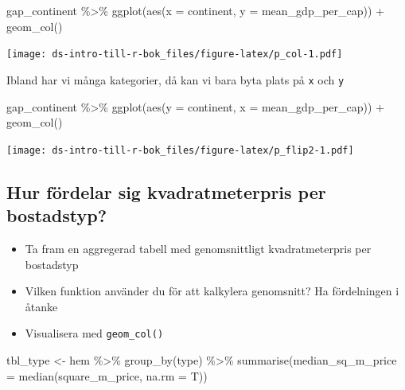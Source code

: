 \documentclass[
]{book}
\newenvironment{Shaded}{\begin{snugshade}}{\end{snugshade}}
\newcommand{\AttributeTok}[1]{\textcolor[rgb]{0.77,0.63,0.00}{#1}}
\newcommand{\FunctionTok}[1]{\textcolor[rgb]{0.00,0.00,0.00}{#1}}
\newcommand{\NormalTok}[1]{#1}
\newcommand{\OtherTok}[1]{\textcolor[rgb]{0.56,0.35,0.01}{#1}}
\newcommand{\SpecialCharTok}[1]{\textcolor[rgb]{0.00,0.00,0.00}{#1}}
\begin{document}
\begin{Shaded}
\begin{Highlighting}[]
\NormalTok{gap\_continent }\SpecialCharTok{\%\textgreater{}\%} 
  \FunctionTok{ggplot}\NormalTok{(}\FunctionTok{aes}\NormalTok{(}\AttributeTok{x =}\NormalTok{ continent, }\AttributeTok{y =}\NormalTok{ mean\_gdp\_per\_cap)) }\SpecialCharTok{+}
  \FunctionTok{geom\_col}\NormalTok{()}
\end{Highlighting}
\end{Shaded}

\texttt{[image: ds-intro-till-r-bok\_files/figure-latex/p\_col-1.pdf]}

Ibland har vi många kategorier, då kan vi bara byta plats på \texttt{x} och \texttt{y}

\begin{Shaded}
\begin{Highlighting}[]
\NormalTok{gap\_continent }\SpecialCharTok{\%\textgreater{}\%} 
  \FunctionTok{ggplot}\NormalTok{(}\FunctionTok{aes}\NormalTok{(}\AttributeTok{y =}\NormalTok{ continent, }\AttributeTok{x =}\NormalTok{ mean\_gdp\_per\_cap)) }\SpecialCharTok{+}
  \FunctionTok{geom\_col}\NormalTok{()}
\end{Highlighting}
\end{Shaded}

\texttt{[image: ds-intro-till-r-bok\_files/figure-latex/p\_flip2-1.pdf]}

\hypertarget{hur-fuxf6rdelar-sig-kvadratmeterpris-per-bostadstyp}{%
\subsection{Hur fördelar sig kvadratmeterpris per bostadstyp?}\label{hur-fuxf6rdelar-sig-kvadratmeterpris-per-bostadstyp}}

\begin{itemize}
\item
  Ta fram en aggregerad tabell med genomsnittligt kvadratmeterpris per bostadstyp
\item
  Vilken funktion använder du för att kalkylera genomsnitt? Ha fördelningen i åtanke
\item
  Visualisera med \texttt{geom\_col()}
\end{itemize}

\begin{Shaded}
\begin{Highlighting}[]
\NormalTok{tbl\_type }\OtherTok{\textless{}{-}}\NormalTok{ hem }\SpecialCharTok{\%\textgreater{}\%} 
  \FunctionTok{group\_by}\NormalTok{(type) }\SpecialCharTok{\%\textgreater{}\%} 
  \FunctionTok{summarise}\NormalTok{(}\AttributeTok{median\_sq\_m\_price =} \FunctionTok{median}\NormalTok{(square\_m\_price, }\AttributeTok{na.rm =}\NormalTok{ T))}
\end{Highlighting}
\end{Shaded}
\end{document}
